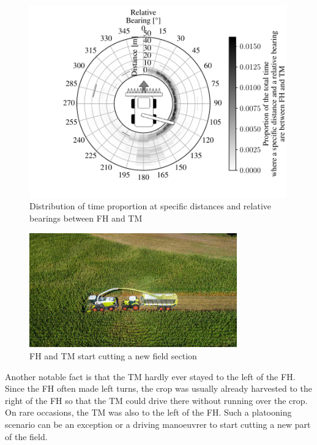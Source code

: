 \begin{figure}%
	\centering
	\includegraphics[width=0.99\textwidth]{figures/bearingHarvestScenario50.pdf}
	\caption{Distribution of time proportion at specific distances and relative bearings between \ac{FH} and \ac{TM}}%
	\label{fig:bearing}%
\end{figure}

\begin{figure}%
	\centering
	\includegraphics[width=0.8\textwidth]{figures/claas_harvest_behind.png}
	\caption{\ac{FH} and \ac{TM} start cutting a new field section}%
	\label{fig:startpart}%
\end{figure}

Another notable fact is that the \ac{TM} hardly ever stayed to the left of the \ac{FH}. Since the \ac{FH} often made left turns, the crop was usually already harvested to the right of the \ac{FH} so that the \ac{TM} could drive there without running over the crop. On rare occasions, the \ac{TM} was also to the left of the \ac{FH}. Such a platooning scenario can be an exception or a driving manoeuvrer to start cutting a new part of the field.   

